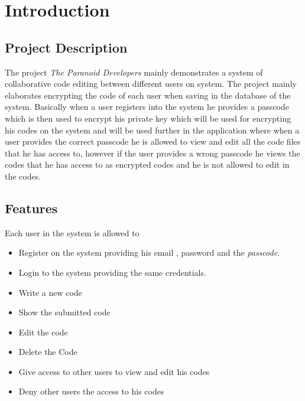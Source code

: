 \chapter{Introduction}

\section{Project Description}
The project \textit{The Paranoid Developers} mainly demonstrates a system of collaborative code editing between different users on system. The project mainly elaborates encrypting the code of each user when saving in the database of the system. Basically when a user registers into the system he provides a passcode which is then used to encrypt his private key which will be used for encrypting his codes on the system and will be used further in the application where when a user provides the correct passcode he is allowed to view and edit all the code files that he has access to, however if the user provides a wrong passcode he views the codes that he has access to as encrypted codes and he is not allowed to edit in the codes.



\section{Features}
 Each user in the system is allowed to  \begin{itemize}
    \item Register on the system providing his email , password and the \textit{passcode}.
     \item Login to the system providing the same credentials.
    \item Write a new code
    \item  Show the submitted code 
    \item  Edit the code 
    \item Delete the Code 
    \item Give access to other users to view and edit his codes
    \item Deny other users the access to his codes
\end{itemize}